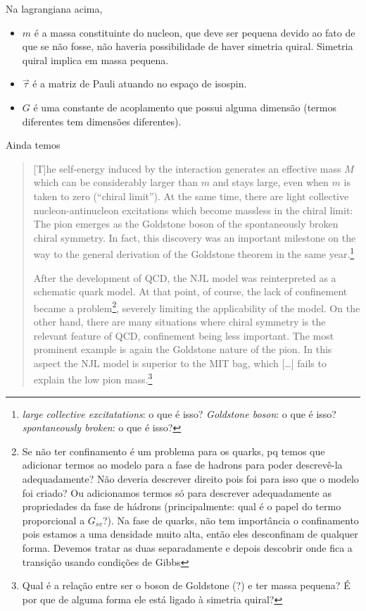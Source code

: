 %
Na lagrangiana acima,
\begin{itemize}
	\item $m$ é a massa constituinte do nucleon, que deve ser pequena devido ao fato de que se não fosse, não haveria possibilidade de haver simetria quiral. Simetria quiral implica em massa pequena.
	\item $\vec{\tau}$ é a matriz de Pauli atuando no espaço de isospin.
	\item $G$ é uma constante de acoplamento que possui alguma dimensão (termos diferentes tem dimensões diferentes).
\end{itemize}

Ainda temos\cite{Buballa}
\begin{quote}
[T]he self-energy induced by the interaction generates an effective mass $M$ which can be considerably larger than $m$ and stays large, even when $m$ is taken to zero (``chiral limit''). At the same time, there are light collective nucleon-antinucleon excitations which become massless in the chiral limit: The pion emerges as the Goldstone boson of the spontaneously broken chiral symmetry. In fact, this discovery was an important milestone on the way to the general derivation of the Goldstone theorem in the same year.\footnote{\emph{large collective excitatations}: o que é isso? \emph{Goldstone boson}: o que é isso? \emph{spontaneously broken}: o que é isso?}

After the development of QCD, the NJL model was reinterpreted as a schematic quark model. At that point, of course, the lack of confinement became a problem\footnote{Se não ter confinamento é um problema para os quarks, pq temos que adicionar termos ao modelo para a fase de hadrons para poder descrevê-la adequadamente? Não deveria descrever direito pois foi para isso que o modelo foi criado? Ou adicionamos termos só para descrever adequadamente as propriedades da fase de hádrons (principalmente: qual é o papel do termo proporcional a $G_{sv}$?). Na fase de quarks, não tem importância o confinamento pois estamos a uma densidade muito alta, então eles desconfinam de qualquer forma. Devemos tratar as duas separadamente e depois descobrir onde fica a transição usando condições de Gibbs}, severely limiting the applicability of the model. On the other hand, there are many situations where chiral symmetry is the relevant feature of QCD, confinement being less important. The most prominent example is again the Goldstone nature of the pion. In this aspect the NJL model is superior to the MIT bag, which [\dots] fails to explain the low pion mass.\footnote{Qual é a relação entre ser o boson de Goldstone (?) e ter massa pequena? É por que de alguma forma ele está ligado à simetria quiral?}
\end{quote}

